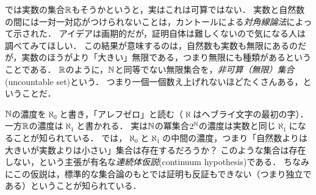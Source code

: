 \documentclass[dvipdfmx, 11pt,a4paper]{jsarticle}
\begin{document}
では実数の集合$\mathbb{R}$もそうかというと，実はこれは可算ではない．
実数と自然数の間には一対一対応がつけられないことは，カントールによる\emph{対角線論法}によって示された．
アイデアは画期的だが，証明自体は難しくないので気になる人は調べてみてほしい．
この結果が意味するのは，自然数も実数も無限にあるのだが，実数のほうがより「大きい」無限である，つまり無限にも種類があるということである．
$\mathbb{R}$のように，$\mathbb{N}$と同等でない無限集合を，\emph{非可算（無限）集合}(uncountable set)という．
つまり一個一個数え上げれないほどたくさんある，ということだ．

\begin{hatten}{}{}
 $\mathbb{N}$の濃度を$\aleph_0$と書き，「アレフゼロ」と読む（$\aleph$はヘブライ文字の最初の字）．
一方$\mathbb{R}$の濃度は$\aleph_1$と書かれる．
実は$\mathbb{N}$の冪集合$2^{\mathbb{N}}$の濃度は実数と同じ$\aleph_1$になることが知られている．
では，$\aleph_0$と$\aleph_1$の中間の濃度，つまり「自然数よりは大きいが実数よりは小さい」集合は存在するだろうか？
このような集合は存在しない，という主張が有名な\emph{連続体仮説}(continuum hypothesis)である．
ちなみにこの仮説は，標準的な集合論のもとでは証明も反証もできない（つまり独立である）ということが知られている．
\end{hatten}
\end{document}
